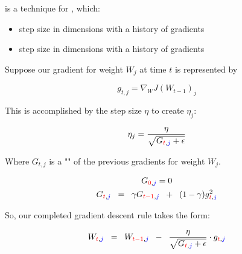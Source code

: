             \begin{definition}
                 is a technique for , which:

                \begin{itemize}
                    \item {} step size in dimensions with a history of  gradients
                    \item {} step size in dimensions with a history of  gradients
                \end{itemize}

                Suppose our gradient for weight $W_j$ at time $t$ is represented by

                \begin{equation*}
                    g_{t,j} = \nabla_{W}J(W_{t-1})_j
                \end{equation*}

                    \phantom{}

                This is accomplished by  the step size $\eta$ to create $\eta_j$:

                \begin{equation*}
                    \eta_j = \frac{\eta}{ \sqrt{G_{\textcolor{red}{t},\textcolor{blue}{j}}+\epsilon} }
                \end{equation*}

                Where $G_{t,j}$ is a "" of the previous gradients for weight $W_j$.

                \begin{equation*}  
                    \begin{gathered}
                        G_{\textcolor{red}{0},\textcolor{blue}{j}} = 0 \\
                        G_{\textcolor{red}{t},\textcolor{blue}{j}} \;\;=\;\; 
                        \gamma G_{\textcolor{red}{t-1},\textcolor{blue}{j}} \;\;+\;\;
                        (1-\gamma) g_{\textcolor{red}{t},\textcolor{blue}{j}}^2
                    \end{gathered}
                \end{equation*}

                So, our completed gradient descent rule takes the form:

                \begin{equation*}
                    W_{\textcolor{red}{t},\textcolor{blue}{j}} \;\;=\;\; 
                    W_{\textcolor{red}{t-1},\textcolor{blue}{j}}  \;\;-\;\; 
                    \frac{\eta}{ \sqrt{G_{\textcolor{red}{t},\textcolor{blue}{j}}+\epsilon} } \cdot g_{\textcolor{red}{t},\textcolor{blue}{j}}
                \end{equation*}
                
            \end{definition}

